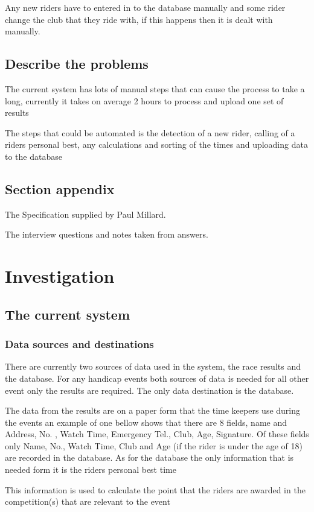 Any new riders have to entered in to the database manually and some rider change the club that they ride with, if this happens then it is dealt with manually.
\subsection{Describe the problems}
The current system has lots of manual steps that can cause the process to take a long, currently it takes on average 2 hours to process and upload one set of results

The steps that could be automated is the detection of a new rider, calling of a riders personal best, any calculations and sorting of the times and uploading data to the database
\subsection{Section appendix}

The Specification supplied by Paul Millard.


The interview questions and notes taken from answers.
\section{Investigation}

\subsection{The current system}

\subsubsection{Data sources and destinations}
There are currently two sources of data used in the system, the race results and the database. For any handicap events both sources of data is needed for all other event only the results are required. The only data destination is the database.

The data from the results are on a paper form that the time keepers use during the events an example of one bellow shows that there are 8 fields, name and Address, No. , Watch Time, Emergency Tel., Club, Age, Signature. Of these fields only Name, No., Watch Time, Club and Age (if the rider is under the age of 18) are recorded in the database. As for the database the only information that is needed form it is the riders personal best time

This information is used to calculate the point that the riders are awarded in the competition(s) that are relevant to the event


